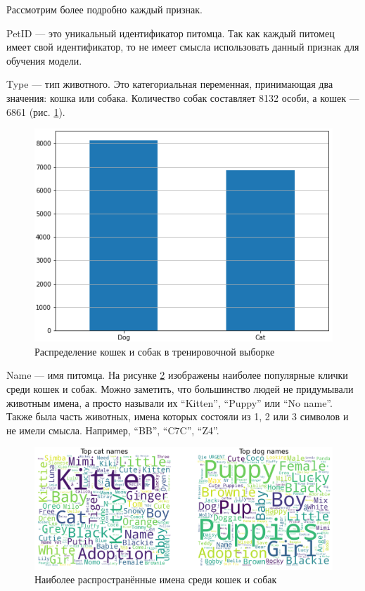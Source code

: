 \documentclass[14pt]{mmcs_article}
\begin{document}
Рассмотрим более подробно каждый признак.

PetID --- это уникальный идентификатор питомца. Так как каждый питомец имеет свой идентификатор, то не имеет смысла использовать данный признак для обучения модели.

Type --- тип животного. Это категориальная переменная, принимающая два значения: кошка или собака. Количество собак составляет 8132 особи, а кошек — 6861 (рис. \ref{analyse:type}).

\begin{figure}[H]
	\centering
	\includegraphics[scale=1.2]{type.png}
	\caption{Распределение кошек и собак в тренировочной выборке}\label{analyse:type}
\end{figure}

Name --- имя питомца. На рисунке \ref{analyse:names} изображены наиболее популярные клички среди кошек и собак. Можно заметить, что большинство людей не придумывали животным имена, а просто называли их “Kitten”, “Puppy” или “No name”. Также была часть животных, имена которых состояли из 1, 2 или 3 символов и не имели смысла. Например, “BB”, “C7C”, “Z4”. 

\begin{figure}[H]
	\centering
	\includegraphics[scale=0.5]{names.png}
	\caption{Наиболее распространённые имена среди кошек и собак}\label{analyse:names}
\end{figure}
\end{document}
